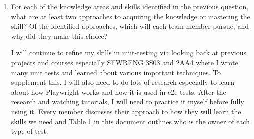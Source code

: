 \documentclass[12pt, titlepage]{article}
\begin{document}
\begin{enumerate}
  \item For each of the knowledge areas and skills identified in the previous
  question, what are at least two approaches to acquiring the knowledge or
  mastering the skill?  Of the identified approaches, which will each team
  member pursue, and why did they make this choice?

  I will continue to refine my skills in unit-testing via looking back at previous projects 
  and courses especially SFWRENG 3S03 and 2AA4 where I wrote many unit tests and learned about
  various important techniques. To supplement this, I will also need to do lots of research
  especially to learn about how Playwright works and how it is used in e2e tests. After the 
  research and watching tutorials, I will need to practice it myself before fully using it.
  Every member discusses their approach to how they will learn the skills we need and Table 1
  in this document outlines who is the owner of each type of test. 
  
\end{enumerate}
\end{document}
